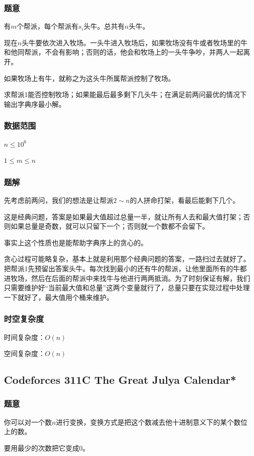 \documentclass{ctexart}
\begin{document}
\subsubsection{题意}
有$m$个帮派，每个帮派有$s_i$头牛。总共有$n$头牛。

现在$n$头牛要依次进入牧场。一头牛进入牧场后，如果牧场没有牛或者牧场里的牛和他同帮派，不会有影响；否则的话，他会和牧场上的一头牛争吵，并两人一起离开。

如果牧场上有牛，就称之为这头牛所属帮派控制了牧场。

求帮派1能否控制牧场；如果能最后最多剩下几头牛；在满足前两问最优的情况下输出字典序最小解。
\subsubsection{数据范围}
$n \le 10^6$

$1 \le m \le n$
\subsubsection{题解}
先考虑前两问，我们的想法是让帮派$2 \sim n$的人拼命打架，看最后能剩下几个。

这是经典问题，答案是如果最大值超过总量一半，就让所有人去和最大值打架；否则如果总量是奇数，就可以只留下一个；否则就一个数都不会留下。

事实上这个性质也是能帮助字典序上的贪心的。

贪心过程可能略复杂，基本上就是利用那个经典问题的答案，一路扫过去就好了。把帮派1先预留出答案头牛。每次找到最小的还有牛的帮派，让他里面所有的牛都进牧场，然后在后面的帮派中来找牛与他进行两两抵消。为了时刻保证有解，我们只需要维护好“当前最大值和总量”这两个变量就行了，总量只要在实现过程中处理一下就好了，最大值用个桶来维护。
\subsubsection{时空复杂度}
时间复杂度：$O(n)$

空间复杂度：$O(n)$
\subsection{Codeforces 311C The Great Julya Calendar*}
\subsubsection{题意}
你可以对一个数$n$进行变换，变换方式是把这个数减去他十进制意义下的某个数位上的数。

要用最少的次数把它变成0。
\end{document}
